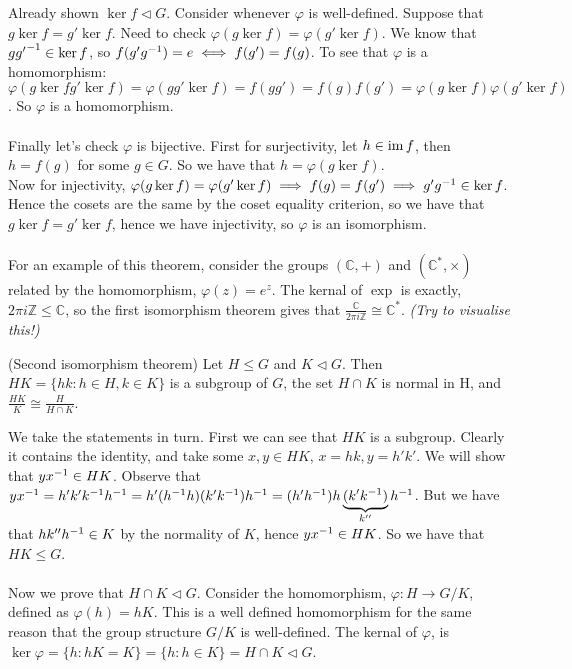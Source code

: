 \documentclass{article}
\newcommand{\nrm}{\triangleleft}
\begin{document}
\begin{itemize}
\begin{theorem}
\end{theorem}
\pf Already shown $ \ker f\nrm G $. Consider whenever $ \varphi $ is well-defined. Suppose that $ g\ker f=g'\ker f. $ Need to check $ \varphi(g\ker f)=\varphi(g'\ker f). $ We know that $ g{g'}^{-1}\in \ker f $, so $ f(g'{g}^{-1})=e\iff f(g')=f(g) $. To see that $ \varphi $ is a homomorphism: $ \varphi(g\ker f g'\ker f)=\varphi(gg'\ker f)=f(gg')=f(g)f(g')=\varphi(g\ker f)\varphi(g'\ker f) $. So $ \varphi $ is a homomorphism.\\\\
Finally let's check $ \varphi $ is bijective. First for surjectivity, let $ h\in \operatorname{im} f $, then $ h=f(g) $ for some $ g\in G $. So we have that $ h=\varphi(g\ker f) $.\\
Now for injectivity, $ \varphi(g\ker f)=\varphi(g'\ker f)\implies f(g)=f(g') \implies g'{g}^{-1}\in\ker f $. Hence the cosets are the same by the coset equality criterion, so we have that $ g\ker f=g'\ker f $, hence we have injectivity, so $ \varphi $ is an isomorphism.\\
\\
For an example of this theorem, consider the groups $ (\mathbb C, +) $ and $ (\mathbb C^*, \times) $ related by the homomorphism, $ \varphi(z)= e^z$. The kernal of $ \exp $ is exactly, $ 2\pi i \mathbb Z\le \mathbb C $, so the first isomorphism theorem gives that $ \frac{\mathbb C}{2\pi i \mathbb Z}\cong \mathbb C^* $. \textit{(Try to visualise this!)} 
\begin{theorem}
	(Second isomorphism theorem) Let $ H\le G $ and $ K\nrm G $. Then $ HK=\{hk : h\in H, k\in K\} $ is a subgroup of $ G $, the set $ H\cap K$ is normal in H, and $ \frac{HK}K\cong \frac H{H\cap K} $.
\end{theorem}
\pf We take the statements in turn. First we can see that $ HK $ is a subgroup. Clearly it contains the identity, and take some $ x,y\in HK $, $ x=hk, y=h'k' $. We will show that $ y{x}^{-1}\in HK $. Observe that $ y{x}^{-1} = h'k'{k}^{-1} {h}^{-1} = h'({h}^{-1} h)(k' {k}^{-1}){h}^{-1} = (h'{h}^{-1})h\underbrace{(k'{k}^{-1})}_{k''}{h}^{-1} $. But we have that $ hk''{h}^{-1} \in K $ by the normality of $ K $, hence $ y{x}^{-1} \in HK $. So we have that $ HK\le G $.\\\\
Now we prove that $ H\cap K\nrm G $. Consider the homomorphism, $ \varphi: H\to G/K $, defined as $ \varphi(h)=hK $. This is a well defined homomorphism for the same reason that the group structure $ G/K $ is well-defined. The kernal of $ \varphi $, is $ \ker \varphi = \{h: hK=K\}=\{h:h\in K\}=H\cap K\nrm G $.\\\\

\end{itemize}
\end{document}
